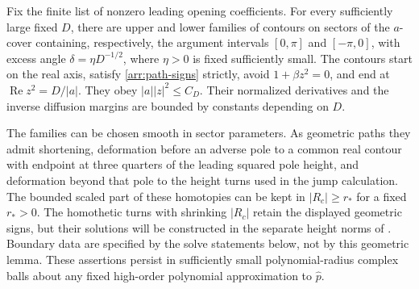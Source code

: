 \begin{lemma}\label{arr:contours}
Fix the finite list of nonzero leading opening coefficients.  For
every sufficiently large fixed \(D\), there are upper and lower
families of contours on sectors of the \(a\)-cover containing,
respectively, the argument intervals \([0,\pi]\) and \([-\pi,0]\),
with excess angle
\(\delta=\eta D^{-1/2}\), where \(\eta>0\) is fixed sufficiently small.
The contours start on the real axis, satisfy
\eqref{arr:path-signs} strictly, avoid \(1+\beta z^2=0\), and end at
\(\operatorname{Re}z^2=D/|a|\).  They obey
\(|a||z|^2\le C_D\).
Their normalized derivatives and the inverse diffusion margins are
bounded by constants depending on \(D\).

The families can be chosen smooth in sector parameters.  As geometric
paths they admit shortening, deformation before an adverse pole to a
common real contour with endpoint at three quarters of the leading
squared pole height, and deformation beyond that pole to the height
turns used in the jump calculation.  The bounded scaled part of these
homotopies can be kept in \(|R_c|\ge r_*\) for a fixed \(r_*>0\).
The homothetic turns with shrinking \(|R_c|\) retain the displayed
geometric signs, but their solutions will be constructed in the separate
height norms of .  Boundary data are specified by the
solve statements below, not by this geometric lemma.  These assertions
persist in sufficiently small polynomial-radius complex balls about
any fixed high-order polynomial approximation to \(\widehat p\).
\end{lemma}

